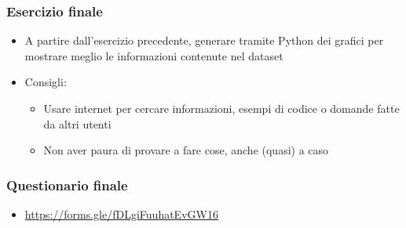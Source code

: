 \begin{exerciseframe}
    \frametitle{Esercizio finale}

    \begin{itemize}
        \item A partire dall'esercizio precedente, generare tramite Python dei grafici per mostrare meglio le informazioni contenute nel dataset

    \bigskip
    \item Consigli:
        \begin{itemize}
            \item Usare internet per cercare informazioni, esempi di codice o domande fatte da altri utenti
            \item Non aver paura di provare a fare cose, anche (quasi) a caso
        \end{itemize}
    \end{itemize}
\end{exerciseframe}


\begin{exampleframe}
    \frametitle{Questionario finale}

    \begin{itemize}
        \item \url{https://forms.gle/fDLgiFuuhatEvGW16}
    \end{itemize}
\end{exampleframe}
